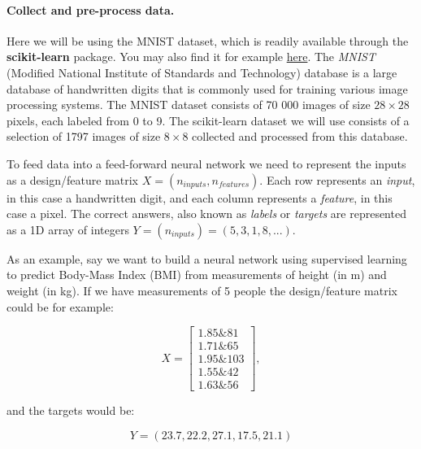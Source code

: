 \noindent
\paragraph{Collect and pre-process data.}
Here we will be using the MNIST dataset, which is readily available through the \textbf{scikit-learn}
package. You may also find it for example \href{{http://yann.lecun.com/exdb/mnist/}}{here}.  
The \emph{MNIST} (Modified National Institute of Standards and Technology) database is a large database
of handwritten digits that is commonly used for training various image processing systems.  
The MNIST dataset consists of 70 000 images of size $28\times 28$ pixels, each labeled from 0 to 9.  
The scikit-learn dataset we will use consists of a selection of 1797 images of size $8\times 8$ collected and processed from this database.  

To feed data into a feed-forward neural network we need to represent
the inputs as a design/feature matrix $X = (n_{inputs}, n_{features})$.  Each
row represents an \emph{input}, in this case a handwritten digit, and
each column represents a \emph{feature}, in this case a pixel.  The
correct answers, also known as \emph{labels} or \emph{targets} are
represented as a 1D array of integers 
$Y = (n_{inputs}) = (5, 3, 1, 8,...)$.

As an example, say we want to build a neural network using supervised learning to predict Body-Mass Index (BMI) from
measurements of height (in m)  
and weight (in kg). If we have measurements of 5 people the design/feature matrix could be for example:  

$$ X = \begin{bmatrix}
1.85 {\&} 81\\
1.71 {\&} 65\\
1.95 {\&} 103\\
1.55 {\&} 42\\
1.63 {\&} 56
\end{bmatrix} ,$$  

and the targets would be:  

$$ Y = (23.7, 22.2, 27.1, 17.5, 21.1) $$  

